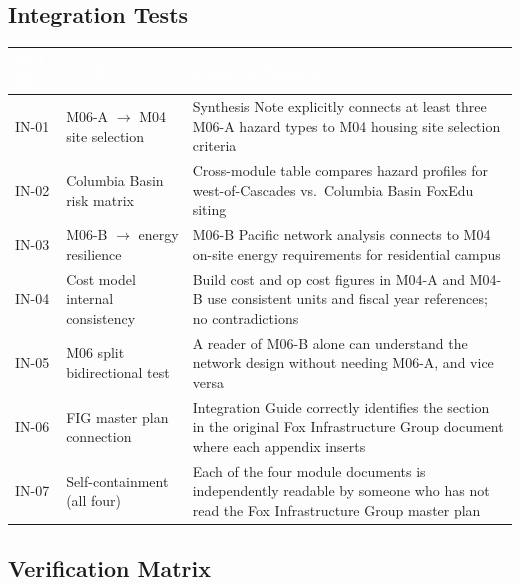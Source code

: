 \documentclass[11pt,letterpaper]{article}
\newcommand{\tableheader}[1]{\textbf{\sffamily\textcolor{white}{#1}}}
\begin{document}
\subsection{Integration Tests}

\begin{center}
\begin{tabularx}{\textwidth}{C{1.5cm}L{3.5cm}X}
\toprule
{}
\tableheader{Test ID} & \tableheader{Verifies} & \tableheader{Expected Behavior} \\
\midrule
IN-01 & M06-A $\rightarrow$ M04 site selection & Synthesis Note explicitly connects at least three M06-A hazard types to M04 housing site selection criteria \\
IN-02 & Columbia Basin risk matrix & Cross-module table compares hazard profiles for west-of-Cascades vs.\ Columbia Basin FoxEdu siting \\
IN-03 & M06-B $\rightarrow$ energy resilience & M06-B Pacific network analysis connects to M04 on-site energy requirements for residential campus \\
IN-04 & Cost model internal consistency & Build cost and op cost figures in M04-A and M04-B use consistent units and fiscal year references; no contradictions \\
IN-05 & M06 split bidirectional test & A reader of M06-B alone can understand the network design without needing M06-A, and vice versa \\
IN-06 & FIG master plan connection & Integration Guide correctly identifies the section in the original Fox Infrastructure Group document where each appendix inserts \\
IN-07 & Self-containment (all four) & Each of the four module documents is independently readable by someone who has not read the Fox Infrastructure Group master plan \\
\bottomrule
\end{tabularx}
\end{center}

\subsection{Verification Matrix}
\end{document}
